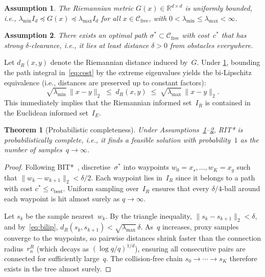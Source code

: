 \documentclass[journal]{IEEEtran}
\newtheorem{theorem}{Theorem}
\newtheorem{assumption}{Assumption}
\newcommand{\Cfree}{\mathcal{C}_{\mathrm{free}}}
\newcommand{\IR}{I_{\!R}}
\newcommand{\IE}{I_{\!E}}
\newcommand{\dR}{d_{\!R}}
\begin{document}
\begin{assumption}\label{assum:bounded}
The Riemannian metric $G(x) \in \mathbb{R}^{d \times d}$ is
uniformly bounded, i.e.,
$\lambda_{\min} I_d \preceq G(x) \preceq \lambda_{\max} I_d$
for all $x \in \Cfree$, with
$0 < \lambda_{\min} \le \lambda_{\max} < \infty$.
\end{assumption}

\begin{assumption}\label{assum:robust}
There exists an optimal path $\sigma^* \subset \Cfree$ with
cost~$c^*$ that has strong $\delta$-clearance, i.e., it lies
at least distance $\delta > 0$ from obstacles everywhere.
\end{assumption}

Let $\dR(x,y)$ denote the Riemannian distance induced
by~$G$. Under \cref{assum:bounded}, bounding the path
integral in~\eqref{eq:cost} by the extreme eigenvalues yields
the bi-Lipschitz equivalence (i.e., distances are preserved up
to constant factors):
\begin{equation}\label{eq:bilip}
  \sqrt{\lambda_{\min}}\,\|x-y\|_2
  \;\le\; \dR(x,y)
  \;\le\; \sqrt{\lambda_{\max}}\,\|x-y\|_2.
\end{equation}
This immediately implies that the Riemannian informed
set~$\IR$ is contained in the Euclidean informed set~$\IE$.

\begin{theorem}[Probabilistic completeness]\label{thm:complete}
Under Assumptions~\ref{assum:bounded}--\ref{assum:robust},
RIT* is probabilistically complete, i.e., it finds a feasible
solution with probability~$1$ as the number of
samples~$q \to \infty$.
\end{theorem}

\begin{proof}
Following BIT*~\cite{Gammell2020}, discretise~$\sigma^*$
into waypoints $w_0{=}x_s, \ldots, w_K{=}x_g$ such that
$\|w_k - w_{k+1}\|_2 < \delta/2$. Each waypoint lies
in~$\IR$ since it belongs to a path with cost
$c^* \le c_{\mathrm{best}}$. Uniform sampling over~$\IR$
ensures that every $\delta/4$-ball around each waypoint is hit
almost surely as $q \to \infty$.

Let $s_k$ be the sample nearest~$w_k$. By the triangle
inequality, $\|s_k - s_{k+1}\|_2 < \delta$, and
by~\eqref{eq:bilip},
$\dR(s_k, s_{k+1}) < \sqrt{\lambda_{\max}}\,\delta$.
As~$q$ increases, proxy samples converge to the waypoints, so
pairwise distances shrink faster than the connection
radius~$r_n^R$ (which decays as $(\log q/q)^{1/d}$),
ensuring all consecutive pairs are connected for sufficiently
large~$q$. The collision-free chain
$s_0 \!\to\! \cdots \!\to\! s_K$ therefore exists in the tree
almost surely.
\end{proof}
\end{document}
